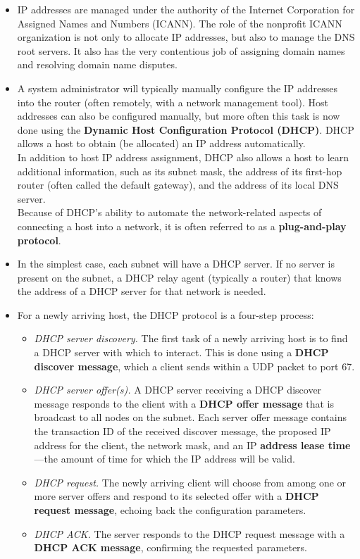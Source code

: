 \begin{itemize}
\item
IP addresses are managed under the authority of the Internet Corporation for Assigned Names and Numbers (ICANN). The role of the nonprofit ICANN organization is not only to allocate IP addresses, but also to manage the DNS root servers. It also has the very contentious job of assigning domain names and resolving domain name disputes.

\item
A system administrator will typically manually configure the IP addresses into the router (often remotely, with a network management tool). Host addresses can also be configured manually, but more often this task is now done using the \textbf{Dynamic Host Configuration Protocol (DHCP)}. DHCP allows a host to obtain (be allocated) an IP address automatically.\\
In addition to host IP address assignment, DHCP also allows a host to learn additional information, such as its subnet mask, the address of its first-hop router (often called the default gateway), and the address of its local DNS server.\\
Because of DHCP's ability to automate the network-related aspects of connecting a host into a network, it is often referred to as a \textbf{plug-and-play protocol}.

\item
In the simplest case, each subnet will have a DHCP server. If no server is present on the subnet, a DHCP relay agent (typically a router) that knows the address of a DHCP server for that network is needed.

\item
For a newly arriving host, the DHCP protocol is a four-step process:
\begin{itemize}
\item
\textit{DHCP server discovery.} The first task of a newly arriving host is to find a DHCP server with which to interact. This is done using a \textbf{DHCP discover message}, which a client sends within a UDP packet to port 67.
\item
\textit{DHCP server offer(s).} A DHCP server receiving a DHCP discover message responds to the client with a \textbf{DHCP offer message} that is broadcast to all nodes on the subnet. Each server offer message contains the transaction ID of the received discover message, the proposed IP address for the client, the network mask, and an IP 	\textbf{address lease time}---the amount of time for which the IP address will be valid.
\item
\textit{DHCP request.} The newly arriving client will choose from among one or more server offers and respond to its selected offer with a \textbf{DHCP request message}, echoing back the configuration parameters.
\item
\textit{DHCP ACK.} The server responds to the DHCP request message with a \textbf{DHCP ACK message}, confirming the requested parameters.
\end{itemize}


\end{itemize}
